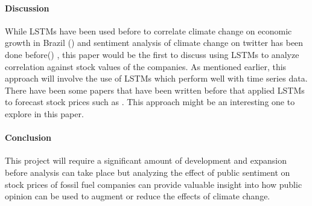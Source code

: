\documentclass[12pt]{article}
\begin{document}
\paragraph{Discussion}
While LSTMs have been used before to correlate climate change on economic growth in Brazil (\cite{mele2021nature}) and sentiment analysis of climate change on twitter has been done before(\cite{dahal2019topic}) , this paper would be the first to discuss using LSTMs to analyze correlation against stock values of the companies.  As mentioned earlier, this approach will involve the use of LSTMs which perform well with time series data. There have been some papers that have been written before that applied LSTMs to forecast stock prices such as \cite{ko2021lstm} . This approach might be an interesting one to explore in this paper.


\paragraph{Conclusion}
This project will require a significant amount of development and expansion before analysis can take place but analyzing the effect of public sentiment on stock prices of fossil fuel companies can provide valuable insight into how public opinion can be used to augment or reduce the effects of climate change.




\end{document}
